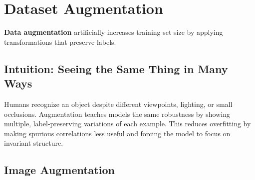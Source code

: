 
\section{Dataset Augmentation }
\label{sec:data-augmentation}

\textbf{Data augmentation} artificially increases training set size by applying transformations that preserve labels.

\subsection{Intuition: Seeing the Same Thing in Many Ways}

Humans recognize an object despite different viewpoints, lighting, or small occlusions. Augmentation teaches models the same robustness by showing multiple, label-preserving variations of each example. This reduces overfitting by making spurious correlations less useful and forcing the model to focus on invariant structure.

\subsection{Image Augmentation}

